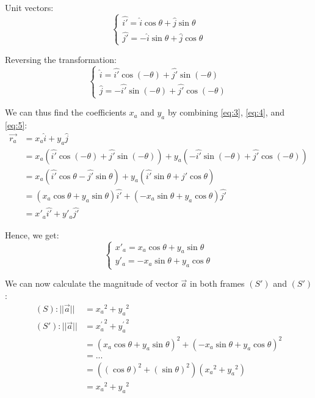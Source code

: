 \documentclass[a4paper,11pt]{article}
\numberwithin{equation}{section}
\begin{document}
  \noindent Unit vectors:
  \begin{equation} \label{eq:4}
  \begin{cases} 
    \hat{i'} = \hat{i} \cos\theta + \hat{j} \sin\theta \\
    \hat{j'} = -\hat{i} \sin\theta + \hat{j} \cos\theta
  \end{cases}
  \end{equation}
  
  \noindent Reversing the transformation:
  \begin{equation} \label{eq:5}
  \begin{cases} 
    \hat{i} = \hat{i'} \cos(-\theta) + \hat{j'} \sin(-\theta) \\
    \hat{j} = -\hat{i'} \sin(-\theta) + \hat{j'} \cos(-\theta)
  \end{cases}
  \end{equation}

  \noindent We can thus find the coefficients $x_{a}$ and $y_{a}$ by combining \eqref{eq:3}, \eqref{eq:4}, and \eqref{eq:5}:\
  \begin{equation} \label{eq:6}
    \begin{split}
      \vec{r_{a}} &= x_{a}\hat{i} + y_{a}\hat{j} \\
      &= x_{a}(\hat{i'} \cos(-\theta) + \hat{j'} \sin(-\theta)) + y_{a}(-\hat{i'} \sin(-\theta) + \hat{j'} \cos(-\theta)) \\
      &= x_{a}(\hat{i'} \cos\theta - \hat{j'} \sin\theta) + y_{a}(\hat{i'} \sin\theta + \hat{j'} \cos\theta) \\
      &= (x_{a}\cos\theta + y_{a}\sin\theta)\hat{i'} + (-x_{a}\sin\theta + y_{a}\cos\theta)\hat{j'} \\
      &= x'_{a}\hat{i'} + y'_{a}\hat{j'}
    \end{split}
  \end{equation}
 
  \noindent Hence, we get: 
  \begin{equation} \label{eq:7}
  \begin{cases} 
    x'_{a} = x_{a}\cos\theta + y_{a}\sin\theta \\ 
    y'_{a} = -x_{a}\sin\theta + y_{a}\cos\theta
  \end{cases}
  \end{equation}
  
  \noindent We can now calculate the magnitude of vector $\vec{a}$ in both frames $(S')$ and $(S')$:
  \begin{equation} \label{eq:8}
    \begin{split}
      (S): ||\vec{a}|| &= {x_{a}}^2 + {y_{a}}^2 \\ 
      (S'): ||\vec{a}|| &= {x^{\prime}_{a}}^2 + {y^{\prime}_{a}}^2 \\
      &= {(x_{a}\cos\theta + y_{a}\sin\theta)}^{2} + {(-x_{a}\sin\theta + y_{a}\cos\theta)}^{2} \\ 
      &= ... \\
      &= ((\cos\theta)^2 + (\sin\theta)^2)({x_{a}}^2 + {y_{a}}^2)\\
      &= {x_{a}}^2 + {y_{a}}^2
    \end{split}
  \end{equation}
  
\end{document}
